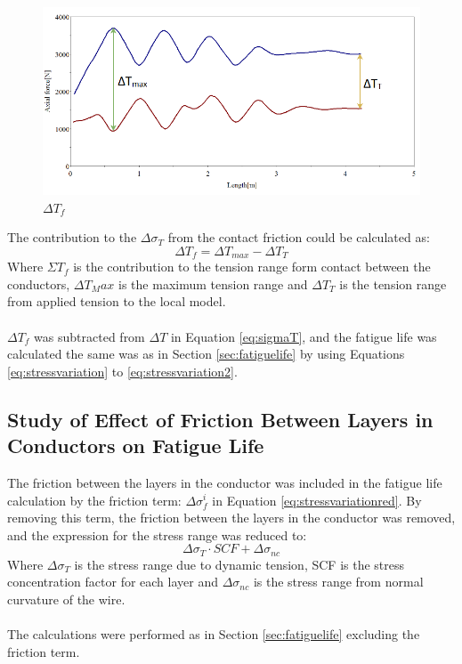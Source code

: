 \begin{figure}[H]
\centering
\includegraphics[scale=0.7]{figures/confric.PNG}
\caption[$\; \:$ $\Delta T_f$]{$\Delta T_f$}
 \label{fig:condfric}
\end{figure}
The contribution to the $\Delta \sigma_T$ from the contact friction could be calculated as:
\begin{equation}
    \Delta T_f = \Delta T_{max} - \Delta T_T
\end{equation}
Where $\Sigma T_f$ is the contribution to the tension range form contact between the conductors, $\Delta T_Max$ is the maximum tension range and $\Delta T_T$ is the tension range from applied tension to the local model.\\\\
$\Delta T_f$ was subtracted from $\Delta T$ in Equation \ref{eq:sigmaT}, and the fatigue life was calculated the same was as in Section \ref{sec:fatiguelife} by using Equations \ref{eq:stressvariation} to \ref{eq:stressvariation2}.

\subsection{Study of Effect of Friction Between Layers in Conductors on Fatigue Life}
The friction between the layers in the conductor was included in the fatigue life calculation by the friction term: $\Delta \sigma_f^i$ in Equation \ref{eq:stressvariationred}. By removing this term, the friction between the layers in the conductor was removed, and the expression for the stress range was reduced to:
\begin{equation}
    \Delta \sigma_T \cdot SCF + \Delta \sigma_{nc}
\end{equation}
Where $\Delta \sigma_T$ is the stress range due to dynamic tension, SCF is the stress concentration factor for each layer and $\Delta \sigma_{nc}$ is the stress range from normal curvature of the wire. \\\\
The calculations were performed as in Section \ref{sec:fatiguelife} excluding the friction term. 




